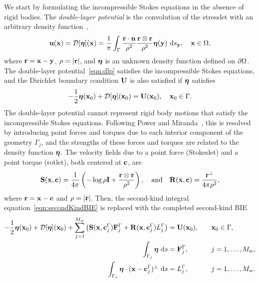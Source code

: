 \documentclass[AMA,STIX1COL]{WileyNJD-v2}
\begin{document}
We start by formulating the incompressible Stokes equations in the
absence of rigid bodies.  The {\em double-layer potential} is the
convolution of the stresslet with an arbitrary density
function~\cite{Ladyzhenskaya1963, Pozrikidis1992},
\begin{align}
  \label{eqn:dlp}
  {\mathbf{u}}({\mathbf{x}}) = {\mathcal{D}}[{\boldsymbol\eta}]({\mathbf{x}}) = \frac{1}{\pi}\int_{\Gamma}
  \frac{{\mathbf{r}}\cdot{\mathbf{n}}}{\rho^2}\frac{{\mathbf{r}} \otimes {\mathbf{r}}}{\rho^2}
  {\boldsymbol\eta}({\mathbf{y}})~\text{d}s_{{\mathbf{y}}}, \quad {\mathbf{x}} \in \Omega,
\end{align}
where ${\mathbf{r}} = {\mathbf{x}} - {\mathbf{y}}$, $\rho=|{\mathbf{r}}|$, and ${\boldsymbol\eta}$ is an unknown density
function defined on ${\partial}\Omega$.  The double-layer
potential~\eqref{eqn:dlp} satisfies the incompressible Stokes equations,
and the Dirichlet boundary condition ${\mathbf{U}}$ is also satisfied if
${\boldsymbol\eta}$ satisfies~\cite{Pozrikidis1992}
\begin{align}
  -\frac{1}{2} {\boldsymbol\eta}({\mathbf{x}}_0) + {\mathcal{D}}[{\boldsymbol\eta}]({\mathbf{x}}_0) = {\mathbf{U}}({\mathbf{x}}_0), 
    \quad {\mathbf{x}}_0 \in \Gamma.
  \label{eqn:secondKindBIE}
\end{align}
The double-layer potential cannot represent rigid body motions that
satisfy the incompressible Stokes equations.  Following Power and
Miranda~\cite{Power1987, Power1993}, this is resolved by introducing
point forces and torques due to each interior component of the geometry
$\Gamma_j$, and the strengths of these forces and torques are related to
the density function ${\boldsymbol\eta}$.  The velocity fields due to a point force
(Stokeslet) and a point torque (rotlet), both centered at ${\mathbf{c}}$, are
\begin{align*}
  \mathbf{S}({\mathbf{x}},{\mathbf{c}}) = \frac{1}{4\pi}\left(-\log\rho\mathbf{I} + 
  \frac{{\mathbf{r}} \otimes {\mathbf{r}}}{\rho^2}\right), \quad \text{and} \quad
  \mathbf{R}({\mathbf{x}},{\mathbf{c}}) = \frac{{\mathbf{r}}^\perp}{4\pi\rho^2},
\end{align*}
where ${\mathbf{r}} = {\mathbf{x}} - {\mathbf{c}}$ and $\rho = |{\mathbf{r}}|$.  Then, the second-kind
integral equation~\eqref{eqn:secondKindBIE} is replaced with the
completed second-kind BIE
\begin{equation}
  \label{eqn:completed_DLP}
  \begin{aligned}
  -\frac{1}{2}{\boldsymbol\eta}({\mathbf{x}}_0) + {\mathcal{D}}[{\boldsymbol\eta}]({\mathbf{x}}_0) + 
    \sum_{j=1}^{M_w} \left(\mathbf{S}({\mathbf{x}},{\mathbf{c}}^\Gamma_j){\mathbf{F}}^\Gamma_j + 
      \mathbf{R}({\mathbf{x}},{\mathbf{c}}^\Gamma_j)L^\Gamma_j\right) &= {\mathbf{U}}({\mathbf{x}}_0),
      \quad &&{\mathbf{x}}_0 \in \Gamma, \\
  \int_{\Gamma_j} {\boldsymbol\eta}~\text{d}s &= {\mathbf{F}}^\Gamma_j, 
      &&j=1,\ldots,M_w, \\
  \int_{\Gamma_j} {\boldsymbol\eta}\cdot ({\mathbf{x}} - {\mathbf{c}}^\Gamma_j)^\perp~\text{d}s &=   
      L^\Gamma_j, &&j=1,\ldots,M_w.
\end{aligned}
\end{equation}
\end{document}
